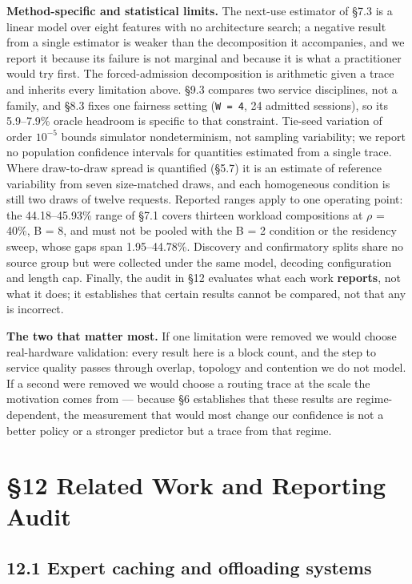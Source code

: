 \documentclass[
  10pt,
  letterpaper,
  10pt]{article}
\begin{document}
\textbf{Method-specific and statistical limits.} The next-use estimator
of §7.3 is a linear model over eight features with no architecture
search; a negative result from a single estimator is weaker than the
decomposition it accompanies, and we report it because its failure is
not marginal and because it is what a practitioner would try first. The
forced-admission decomposition is arithmetic given a trace and inherits
every limitation above. §9.3 compares two service disciplines, not a
family, and §8.3 fixes one fairness setting (\texttt{W\ =\ 4}, 24
admitted sessions), so its 5.9--7.9\% oracle headroom is specific to
that constraint. Tie-seed variation of order \(10^{-5}\) bounds
simulator nondeterminism, not sampling variability; we report no
population confidence intervals for quantities estimated from a single
trace. Where draw-to-draw spread is quantified (§5.7) it is an estimate
of reference variability from seven size-matched draws, and each
homogeneous condition is still two draws of twelve requests. Reported
ranges apply to one operating point: the 44.18--45.93\% range of §7.1
covers thirteen workload compositions at \(\rho\) = 40\%, B = 8, and
must not be pooled with the B = 2 condition or the residency sweep,
whose gaps span 1.95--44.78\%. Discovery and confirmatory splits share
no source group but were collected under the same model, decoding
configuration and length cap. Finally, the audit in §12 evaluates what
each work \textbf{reports}, not what it does; it establishes that
certain results cannot be compared, not that any is incorrect.

\textbf{The two that matter most.} If one limitation were removed we
would choose real-hardware validation: every result here is a block
count, and the step to service quality passes through overlap, topology
and contention we do not model. If a second were removed we would choose
a routing trace at the scale the motivation comes from --- because §6
establishes that these results are regime-dependent, the measurement
that would most change our confidence is not a better policy or a
stronger predictor but a trace from that regime.

\section{§12 Related Work and Reporting
Audit}\label{related-work-and-reporting-audit}

\subsection{12.1 Expert caching and offloading
systems}\label{expert-caching-and-offloading-systems}
\end{document}
